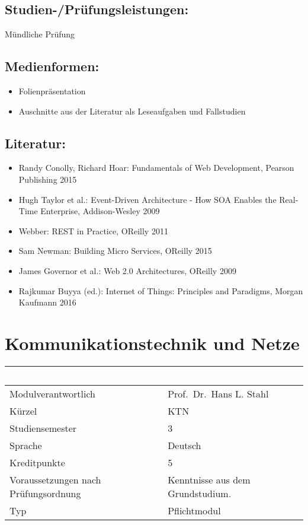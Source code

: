 \section*{Studien-/Prüfungsleistungen:}\label{studien-pruxfcfungsleistungen-10}

Mündliche Prüfung

\section*{Medienformen:}\label{medienformen-6}

\begin{itemize}
\item
  Folienpräsentation
\item
  Auschnitte aus der Literatur als Leseaufgaben und Fallstudien
\end{itemize}

\section*{Literatur:}\label{literatur-8}

\begin{itemize}
\item
  Randy Conolly, Richard Hoar: Fundamentals of Web Development, Pearson
  Publishing 2015
\item
  Hugh Taylor et al.: Event-Driven Architecture - How SOA Enables the
  Real-Time Enterprise, Addison-Wesley 2009
\item
  Webber: REST in Practice, OReilly 2011
\item
  Sam Newman: Building Micro Services, OReilly 2015
\item
  James Governor et al.: Web 2.0 Architectures, OReilly 2009
\item
  Rajkumar Buyya (ed.): Internet of Things: Principles and Paradigms,
  Morgan Kaufmann 2016
\end{itemize}

\chapter{Kommunikationstechnik und
Netze}\label{kommunikationstechnik-und-netze}

\begin{longtable}[]{@{}ll@{}}
\toprule
~ & ~\tabularnewline
\midrule
\endhead
Modulverantwortlich & Prof.~Dr.~Hans L. Stahl\tabularnewline
Kürzel & KTN\tabularnewline
Studiensemester & 3\tabularnewline
Sprache & Deutsch\tabularnewline
Kreditpunkte & 5\tabularnewline
Voraussetzungen nach Prüfungsordnung & Kenntnisse aus dem
Grundstudium.\tabularnewline
Typ & Pflichtmodul\tabularnewline
\bottomrule
\end{longtable}

